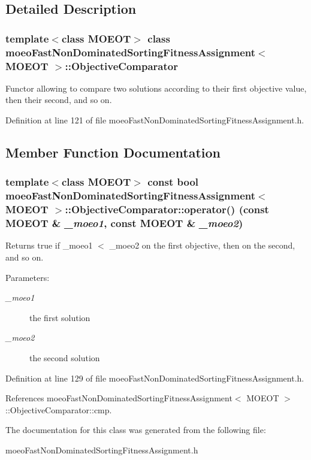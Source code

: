 \subsection{Detailed Description}
\subsubsection*{template$<$class MOEOT$>$ class moeo\-Fast\-Non\-Dominated\-Sorting\-Fitness\-Assignment$<$ MOEOT $>$::Objective\-Comparator}

Functor allowing to compare two solutions according to their first objective value, then their second, and so on. 



Definition at line 121 of file moeo\-Fast\-Non\-Dominated\-Sorting\-Fitness\-Assignment.h.

\subsection{Member Function Documentation}
\subsubsection{\setlength{\rightskip}{0pt plus 5cm}template$<$class MOEOT$>$ const bool \bf{moeo\-Fast\-Non\-Dominated\-Sorting\-Fitness\-Assignment}$<$ MOEOT $>$::Objective\-Comparator::operator() (const MOEOT \& {\em \_\-moeo1}, const MOEOT \& {\em \_\-moeo2})\hspace{0.3cm}{\tt  [inline]}}\label{classmoeoFastNonDominatedSortingFitnessAssignment_1_1ObjectiveComparator_21ba1645a166a348a24c204e88f97987}


Returns true if \_\-moeo1 $<$ \_\-moeo2 on the first objective, then on the second, and so on. 

\begin{Desc}
\item[Parameters:]
\begin{description}
\item[{\em \_\-moeo1}]the first solution \item[{\em \_\-moeo2}]the second solution \end{description}
\end{Desc}


Definition at line 129 of file moeo\-Fast\-Non\-Dominated\-Sorting\-Fitness\-Assignment.h.

References moeo\-Fast\-Non\-Dominated\-Sorting\-Fitness\-Assignment$<$ MOEOT $>$::Objective\-Comparator::cmp.

The documentation for this class was generated from the following file:\begin{CompactItemize}
\item 
moeo\-Fast\-Non\-Dominated\-Sorting\-Fitness\-Assignment.h\end{CompactItemize}
